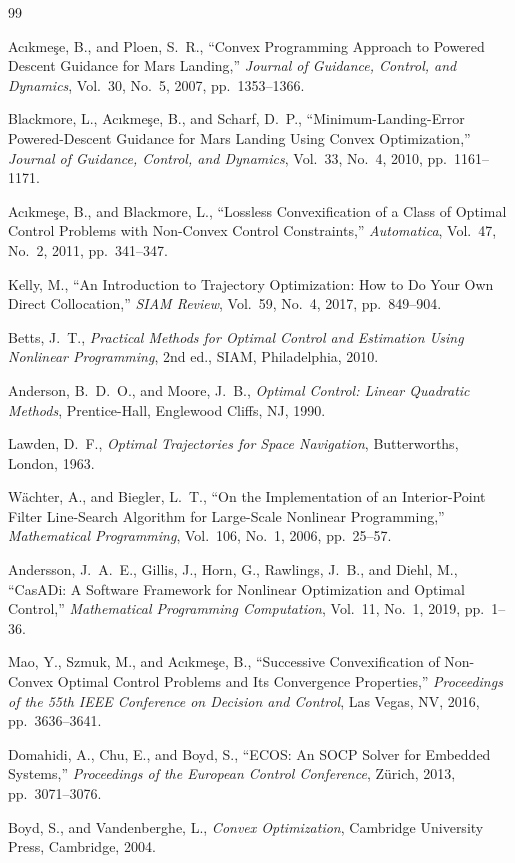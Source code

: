 \documentclass[11pt]{article}
\begin{document}
\begin{thebibliography}{99}

Ac\i kme\c{s}e, B., and Ploen, S.~R.,
``Convex Programming Approach to Powered Descent Guidance for Mars
Landing,''
\emph{Journal of Guidance, Control, and Dynamics}, Vol.~30, No.~5, 2007,
pp.~1353--1366.

Blackmore, L., Ac\i kme\c{s}e, B., and Scharf, D.~P.,
``Minimum-Landing-Error Powered-Descent Guidance for Mars Landing Using
Convex Optimization,''
\emph{Journal of Guidance, Control, and Dynamics}, Vol.~33, No.~4, 2010,
pp.~1161--1171.

Ac\i kme\c{s}e, B., and Blackmore, L.,
``Lossless Convexification of a Class of Optimal Control Problems with
Non-Convex Control Constraints,''
\emph{Automatica}, Vol.~47, No.~2, 2011, pp.~341--347.

Kelly, M.,
``An Introduction to Trajectory Optimization: How to Do Your Own Direct
Collocation,''
\emph{SIAM Review}, Vol.~59, No.~4, 2017, pp.~849--904.

Betts, J.~T.,
\emph{Practical Methods for Optimal Control and Estimation Using Nonlinear
Programming}, 2nd ed., SIAM, Philadelphia, 2010.

Anderson, B.~D.~O., and Moore, J.~B.,
\emph{Optimal Control: Linear Quadratic Methods}, Prentice-Hall,
Englewood Cliffs, NJ, 1990.

Lawden, D.~F.,
\emph{Optimal Trajectories for Space Navigation}, Butterworths, London,
1963.

W\"achter, A., and Biegler, L.~T.,
``On the Implementation of an Interior-Point Filter Line-Search Algorithm
for Large-Scale Nonlinear Programming,''
\emph{Mathematical Programming}, Vol.~106, No.~1, 2006, pp.~25--57.

Andersson, J.~A.~E., Gillis, J., Horn, G., Rawlings, J.~B., and Diehl, M.,
``CasADi: A Software Framework for Nonlinear Optimization and Optimal
Control,''
\emph{Mathematical Programming Computation}, Vol.~11, No.~1, 2019,
pp.~1--36.

Mao, Y., Szmuk, M., and Ac\i kme\c{s}e, B.,
``Successive Convexification of Non-Convex Optimal Control Problems and Its
Convergence Properties,''
\emph{Proceedings of the 55th IEEE Conference on Decision and Control},
Las Vegas, NV, 2016, pp.~3636--3641.

Domahidi, A., Chu, E., and Boyd, S.,
``ECOS: An SOCP Solver for Embedded Systems,''
\emph{Proceedings of the European Control Conference}, Z\"urich, 2013,
pp.~3071--3076.

Boyd, S., and Vandenberghe, L.,
\emph{Convex Optimization}, Cambridge University Press, Cambridge, 2004.

\end{thebibliography}
\end{document}
